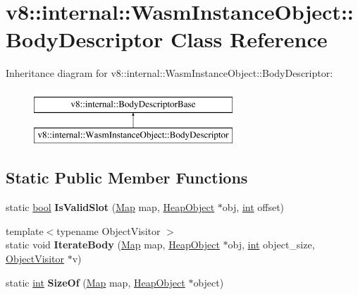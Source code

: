 \hypertarget{classv8_1_1internal_1_1WasmInstanceObject_1_1BodyDescriptor}{}\section{v8\+:\+:internal\+:\+:Wasm\+Instance\+Object\+:\+:Body\+Descriptor Class Reference}
\label{classv8_1_1internal_1_1WasmInstanceObject_1_1BodyDescriptor}
Inheritance diagram for v8\+:\+:internal\+:\+:Wasm\+Instance\+Object\+:\+:Body\+Descriptor\+:\begin{figure}[H]
\begin{center}
\leavevmode
\includegraphics[height=2.000000cm]{classv8_1_1internal_1_1WasmInstanceObject_1_1BodyDescriptor}
\end{center}
\end{figure}
\subsection*{Static Public Member Functions}
\begin{DoxyCompactItemize}
\item 
\mbox{\label{classv8_1_1internal_1_1WasmInstanceObject_1_1BodyDescriptor_af864a03dc5681841ecee28cefc534808}} 
static \mbox{\hyperlink{classbool}{bool}} {\bfseries Is\+Valid\+Slot} (\mbox{\hyperlink{classv8_1_1internal_1_1Map}{Map}} map, \mbox{\hyperlink{classv8_1_1internal_1_1HeapObject}{Heap\+Object}} $\ast$obj, \mbox{\hyperlink{classint}{int}} offset)
\item 
\mbox{\label{classv8_1_1internal_1_1WasmInstanceObject_1_1BodyDescriptor_ae19940f3e0d0b88121707b8d01830ecb}} 
{\footnotesize template$<$typename Object\+Visitor $>$ }\\static void {\bfseries Iterate\+Body} (\mbox{\hyperlink{classv8_1_1internal_1_1Map}{Map}} map, \mbox{\hyperlink{classv8_1_1internal_1_1HeapObject}{Heap\+Object}} $\ast$obj, \mbox{\hyperlink{classint}{int}} object\+\_\+size, \mbox{\hyperlink{classv8_1_1internal_1_1ObjectVisitor}{Object\+Visitor}} $\ast$v)
\item 
\mbox{\label{classv8_1_1internal_1_1WasmInstanceObject_1_1BodyDescriptor_a7e31687d0fa301a9127415e2ea42644d}} 
static \mbox{\hyperlink{classint}{int}} {\bfseries Size\+Of} (\mbox{\hyperlink{classv8_1_1internal_1_1Map}{Map}} map, \mbox{\hyperlink{classv8_1_1internal_1_1HeapObject}{Heap\+Object}} $\ast$object)
\end{DoxyCompactItemize}
